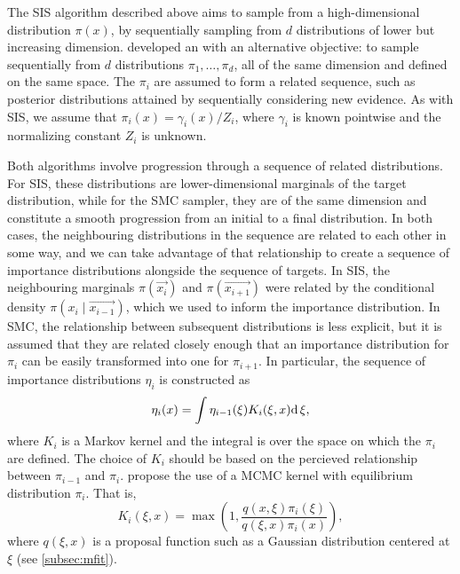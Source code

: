 The \gls{SIS} algorithm described above aims to sample from a high-dimensional
distribution $\pi(x)$, by sequentially sampling from $d$ distributions of lower
but increasing dimension. \textcite{del2006sequential} developed an
 with an alternative objective: to sample sequentially
from $d$ distributions $\pi_1, \ldots, \pi_d$, all of the same dimension and
defined on the same space. The $\pi_i$ are assumed to form a related sequence,
such as posterior distributions attained by sequentially considering new
evidence. As with \gls{SIS}, we assume that $\pi_i(x) = \gamma_i(x) / Z_i$,
where $\gamma_i$ is known pointwise and the normalizing constant $Z_i$ is
unknown.

Both algorithms involve progression through a sequence of related
distributions. For \gls{SIS}, these distributions are lower-dimensional
marginals of the target distribution, while for the \gls{SMC} sampler, they are
of the same dimension and constitute a smooth progression from an initial to a
final distribution. In both cases, the neighbouring distributions in the
sequence are related to each other in some way, and we can take advantage of
that relationship to create a sequence of importance distributions alongside
the sequence of targets. In \gls{SIS}, the neighbouring marginals
$\pi(\vec{x_i})$ and $\pi(\vec{x_{i+1}})$ were related by the conditional
density $\pi(x_i \mid \vec{x_{i-1}})$, which we used to inform the importance
distribution. In \gls{SMC}, the relationship between subsequent distributions
is less explicit, but it is assumed that they are related closely enough that
an importance distribution for $\pi_i$ can be easily transformed into one for
$\pi_{i+1}$. In particular, the sequence of importance distributions $\eta_i$
is constructed as
\begin{align}
  \label{eq:impint}
  \eta_i(x) = \int \eta_{i-1}(\xi) K_i(\xi, x) \mathrm{d}\,\xi,
\end{align}
where $K_i$ is a Markov kernel and the integral is over the space on which the
$\pi_i$ are defined. The choice of $K_i$ should be based on the percieved
relationship between $\pi_{i-1}$ and $\pi_i$. \textcite{del2006sequential}
propose the use of a \gls{MCMC} kernel with equilibrium distribution $\pi_i$.
That is,
\[
  K_i(\xi, x) = \max\left(1, \frac{q(x, \xi)\pi_i(\xi)}{q(\xi, x)\pi_i(x)}\right),
\]
where $q(\xi, x)$ is a proposal function such as a Gaussian distribution
centered at $\xi$ (see \cref{subsec:mfit}). 

